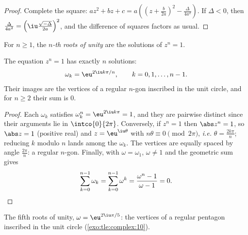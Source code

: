 \begin{proof}
Complete the square:
$az^2 + bz + c = a\left(\left(z + \frac{b}{2a}\right)^2 -
\frac{\Delta}{4a^2}\right)$. If $\Delta < 0$, then
$\frac{\Delta}{4a^2} = \left(\iu\frac{\sqrt{-\Delta}}{2a}\right)^2$, and the
difference of squares factors as usual.
\end{proof}

\begin{definition}\label{def:tle:complex:rootsofunity}
For $n \geq 1$, the \emph{$n$-th roots of unity} are
the solutions of $z^n = 1$.
\end{definition}

\begin{theorem}\label{thm:tle:complex:rootsofunity}
The equation $z^n = 1$ has exactly $n$ solutions:
\[
\omega_k = \eu^{2\iu k\pi/n}, \qquad k = 0, 1, \dots, n-1 .
\]
Their images are the vertices of a regular $n$-gon inscribed in the unit
circle, and for $n \geq 2$ their sum is $0$.
\end{theorem}

\begin{proof}
Each $\omega_k$ satisfies $\omega_k^n = \eu^{2\iu k\pi} = 1$, and they are
pairwise distinct since their arguments lie in $\intco{0}{2\pi}$.
Conversely, if $z^n = 1$ then $\abs z^n = 1$, so $\abs z = 1$ (positive
real) and $z = \eu^{\iu\theta}$ with $n\theta \equiv 0 \pmod{2\pi}$,
\emph{i.e.} $\theta = \frac{2k\pi}{n}$; reducing $k$ modulo $n$ lands among
the $\omega_k$. The vertices are equally spaced by angle $\frac{2\pi}{n}$:
a regular $n$-gon. Finally, with $\omega = \omega_1$,
$\omega \neq 1$ and the geometric sum gives
\[
\sum_{k=0}^{n-1}\omega_k = \sum_{k=0}^{n-1}\omega^k
= \frac{\omega^n - 1}{\omega - 1} = 0 . \qedhere
\]
\end{proof}

\begin{omfigure}

{\small The fifth roots of unity, $\omega = \eu^{2\iu\pi/5}$: the
vertices of a regular pentagon inscribed in the unit circle
(\cref{exo:tle:complex:10}).}
\end{omfigure}

